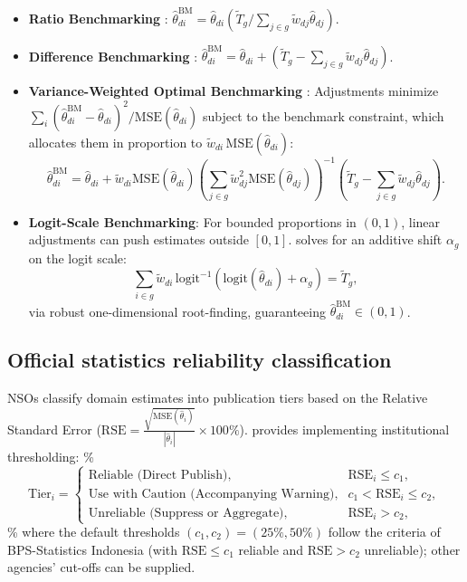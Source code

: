 \begin{itemize}
  \item \textbf{Ratio Benchmarking} \citep{you2002small}: $\hat{\theta}_{di}^{\text{BM}} = \hat{\theta}_{di} \left( \tilde{T}_g / \sum_{j \in g} \tilde{w}_{dj} \hat{\theta}_{dj} \right)$.
  \item \textbf{Difference Benchmarking} \citep{rao2015small}: $\hat{\theta}_{di}^{\text{BM}} = \hat{\theta}_{di} + \left( \tilde{T}_g - \sum_{j \in g} \tilde{w}_{dj} \hat{\theta}_{dj} \right)$.
  \item \textbf{Variance-Weighted Optimal Benchmarking} \citep{datta2011bayesian, steorts2014benchmarking}: Adjustments minimize $\sum_{i} (\hat{\theta}_{di}^{\text{BM}} - \hat{\theta}_{di})^2 / \mathrm{MSE}(\hat{\theta}_{di})$ subject to the benchmark constraint, which allocates them in proportion to $\tilde{w}_{di}\,\mathrm{MSE}(\hat{\theta}_{di})$:
  \begin{equation}
  \hat{\theta}_{di}^{\text{BM}} = \hat{\theta}_{di} + \tilde{w}_{di} \mathrm{MSE}(\hat{\theta}_{di}) \left( \sum_{j \in g} \tilde{w}_{dj}^2 \mathrm{MSE}(\hat{\theta}_{dj}) \right)^{-1} \left( \tilde{T}_g - \sum_{j \in g} \tilde{w}_{dj} \hat{\theta}_{dj} \right).
  \end{equation}
  \item \textbf{Logit-Scale Benchmarking}: For bounded proportions in $(0, 1)$, linear adjustments can push estimates outside $[0, 1]$.  solves for an additive shift $\alpha_g$ on the logit scale:
  \begin{equation}
  \sum_{i \in g} \tilde{w}_{di} \, \mathrm{logit}^{-1}\left( \mathrm{logit}(\hat{\theta}_{di}) + \alpha_g \right) = \tilde{T}_g,
  \end{equation}
  via robust one-dimensional root-finding, guaranteeing $\hat{\theta}_{di}^{\text{BM}} \in (0, 1)$.
\end{itemize}

\subsection{Official statistics reliability classification} \label{sec:methods_reliability}

NSOs classify domain estimates into publication tiers based on the Relative Standard Error (\(\mathrm{RSE} = \frac{\sqrt{\mathrm{MSE}(\hat{\theta}_i)}}{|\hat{\theta}_i|} \times 100\%\)).  provides  implementing institutional thresholding:
\%
\begin{equation} \label{eq:reliability}
\mathrm{Tier}_i = \begin{cases}
\text{Reliable (Direct Publish)}, & \mathrm{RSE}_i \le c_1, \\
\text{Use with Caution (Accompanying Warning)}, & c_1 < \mathrm{RSE}_i \le c_2, \\
\text{Unreliable (Suppress or Aggregate)}, & \mathrm{RSE}_i > c_2,
\end{cases}
\end{equation}
\%
where the default thresholds \((c_1, c_2) = (25\%, 50\%)\) follow the criteria of BPS-Statistics Indonesia (with \(\mathrm{RSE} \le c_1\) reliable and \(\mathrm{RSE} > c_2\) unreliable); other agencies' cut-offs can be supplied.


